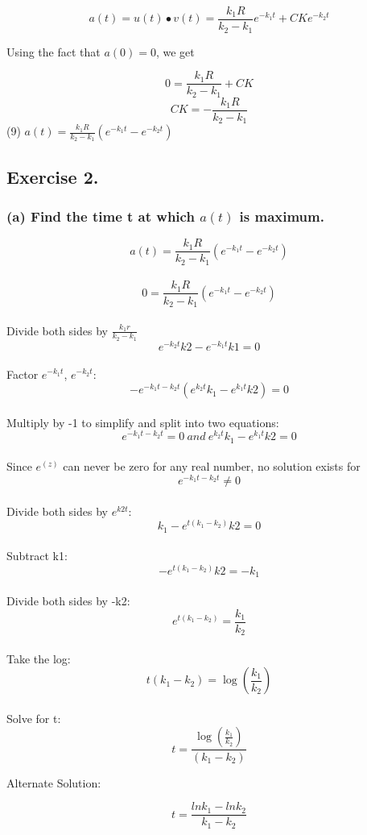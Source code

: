 \documentclass[]{article}
\begin{document}
\[a(t) = u(t) \bullet v(t) = \frac{k_1R}{k_2-k_1}e^{-k_1t} + CKe^{-k_2t}\]

Using the fact that \(a(0) = 0\), we get

\[0 = \frac{k_1R}{k_2-k_1} + CK\] \[CK = -\frac{k_1R}{k_2-k_1}\] (9)
\(a(t) = \frac{k_1R}{k_2-k_1}(e^{-k_1t} - e^{-k_2t})\)

\subsection{Exercise 2.}\label{exercise-2.}

\subsubsection{\texorpdfstring{(a) Find the time t at which \(a(t)\) is
maximum.}{(a) Find the time t at which a(t) is maximum.}}\label{a-find-the-time-t-at-which-at-is-maximum.}

\[a(t) = \frac{k_1 R}{k_2 - k_1}(e^{-k_1 t}-e^{-k_2 t})\]\\
\[0 = \frac{k_1 R}{k_2 - k_1}(e^{-k_1 t}-e^{-k_2 t})\]\\
Divide both sides by \(\frac{k_1 r}{k_2 - k_1}\)\\
\[e^{-k_2 t}k2 - e^{-k_1 t}k1 = 0\]\\
Factor \(e^{-k_1 t}\), \(e^{-k_2 t}\):\\
\[-e^{-k_1 t - k_2 t}(e^{k_2 t}k_1 - e^{k_1 t}k2) = 0\]\\
Multiply by -1 to simplify and split into two equations:\\
\[e^{-k_1 t - k_2 t} = 0 ~and~e^{k_2 t}k_1 - e^{k_1 t}k2= 0\]\\
Since \(e^(z)\) can never be zero for any real number, no solution
exists for \[e^{-k_1 t - k_2 t} \neq 0\]\\
Divide both sides by \(e^{k2 t}\):\\
\[k_1 - e^{t (k_1 - k_2)}k2= 0\]\\
Subtract k1:\\
\[- e^{t (k_1 - k_2)}k2= -k_1\]\\
Divide both sides by -k2:\\
\[e^{t (k_1 - k_2)}= \frac{k_1}{k_2}\]\\
Take the log: \[t (k_1 - k_2)= \log{(\frac{k_1}{k_2})}\]\\
Solve for t: \[t = \frac{\log{(\frac{k_1}{k_2})}}{(k_1 - k_2)}\]

Alternate Solution:

\[t = \frac{lnk_1 - lnk_2}{k_1 - k_2}\]
\end{document}
